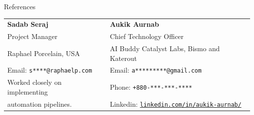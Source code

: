 \documentclass[letterpaper,10pt]{article}
\newcommand{\header} [1] {
  {\hspace*{-18pt}\vspace*{5pt} #1}
  \vspace*{-3pt} \hrulefill \\ \vspace*{5pt}
}
\begin{document}
\begin{sloppypar}
  \vspace{1mm}
  \header{References}
  \begin{tabular}{@{}p{}p{}@{}}
    \textbf{Sadab Seraj} &
    \textbf{Aukik Aurnab} \\

    Project Manager &
    Chief Technology Officer \\

    Raphael Porcelain, USA &
    AI Buddy Catalyst Labs, Bismo and Katerout \\

    Email: \texttt{s****@raphaelp.com} &
    Email: \texttt{a*********@gmail.com} \\

    Worked closely on implementing &
    Phone: \texttt{+880-***-***-****} \\

    automation pipelines. &
    Linkedin: \href{https://www.linkedin.com/in/aukik-aurnab/}{\texttt{linkedin.com/in/aukik-aurnab/}} \\
  \end{tabular}

\end{sloppypar}
\end{document}
